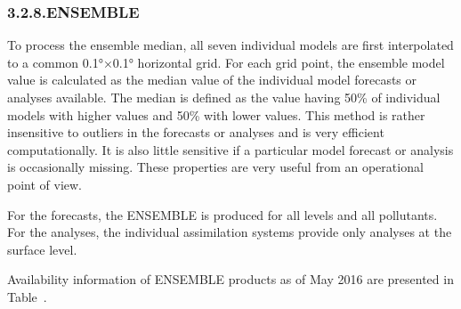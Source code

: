 \documentclass[9pt]{report}
\begin{document}
\subsubsection{3.2.8.\hspace*{0.5em}ENSEMBLE}\label{sec-ensemble}%

\noindent{}To process the ensemble median, all seven individual models are first interpolated to a common 0.1°×0.1° horizontal grid.
For each grid point, the ensemble model value is calculated as the median value of the individual model forecasts or analyses available.
The median is defined as the value having 50\% of individual models with higher values and 50\% with lower values.
This method is rather insensitive to outliers in the forecasts or analyses and is very efficient computationally.
It is also little sensitive if a particular model forecast or analysis is occasionally missing.
These properties are very useful from an operational point of view.%

For the forecasts, the ENSEMBLE is produced for all levels and all pollutants.
For the analyses, the individual assimilation systems provide only analyses at the surface level.%

Availability information of ENSEMBLE products as of May 2016 are presented in Table~.%
\end{document}
